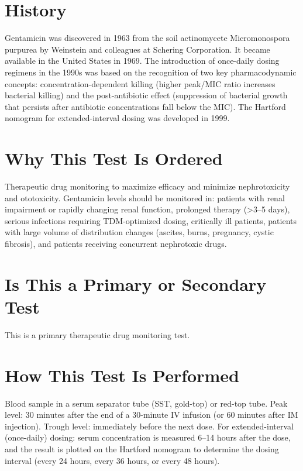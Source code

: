 \section*{History}
Gentamicin was discovered in 1963 from the soil actinomycete Micromonospora purpurea by Weinstein and colleagues at Schering Corporation. It became available in the United States in 1969. The introduction of once-daily dosing regimens in the 1990s was based on the recognition of two key pharmacodynamic concepts: concentration-dependent killing (higher peak/MIC ratio increases bacterial killing) and the post-antibiotic effect (suppression of bacterial growth that persists after antibiotic concentrations fall below the MIC). The Hartford nomogram for extended-interval dosing was developed in 1999.

\section*{Why This Test Is Ordered}
Therapeutic drug monitoring to maximize efficacy and minimize nephrotoxicity and ototoxicity. Gentamicin levels should be monitored in: patients with renal impairment or rapidly changing renal function, prolonged therapy (>3--5 days), serious infections requiring TDM-optimized dosing, critically ill patients, patients with large volume of distribution changes (ascites, burns, pregnancy, cystic fibrosis), and patients receiving concurrent nephrotoxic drugs.

\section*{Is This a Primary or Secondary Test}
This is a primary therapeutic drug monitoring test.

\section*{How This Test Is Performed}
Blood sample in a serum separator tube (SST, gold-top) or red-top tube. Peak level: 30 minutes after the end of a 30-minute IV infusion (or 60 minutes after IM injection). Trough level: immediately before the next dose. For extended-interval (once-daily) dosing: serum concentration is measured 6--14 hours after the dose, and the result is plotted on the Hartford nomogram to determine the dosing interval (every 24 hours, every 36 hours, or every 48 hours).

